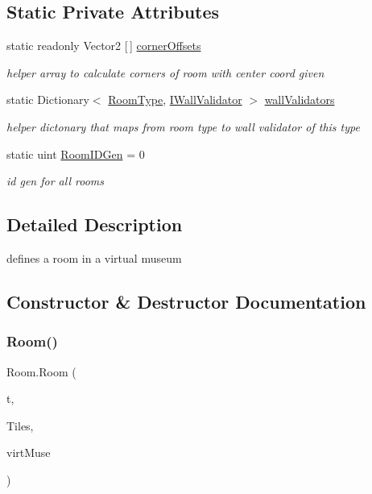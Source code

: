 \subsection*{Static Private Attributes}
\begin{DoxyCompactItemize}
\item 
static readonly Vector2 \mbox{[}$\,$\mbox{]} \mbox{\hyperlink{class_room_aeb66d344acdc21822d0598beb0d7d71b}{corner\+Offsets}}
\begin{DoxyCompactList}\small\item\em helper array to calculate corners of room with center coord given \end{DoxyCompactList}\item 
static Dictionary$<$ \mbox{\hyperlink{_room_8cs_ab540f7414f306325d92272bcef1e34e1}{Room\+Type}}, \mbox{\hyperlink{interface_i_wall_validator}{I\+Wall\+Validator}} $>$ \mbox{\hyperlink{class_room_a274899cf7b41ac5190fb7754817510d6}{wall\+Validators}}
\begin{DoxyCompactList}\small\item\em helper dictonary that maps from room type to wall validator of this type \end{DoxyCompactList}\item 
static uint \mbox{\hyperlink{class_room_a2e52c767e772a29e39cb5598aea534fb}{Room\+I\+D\+Gen}} = 0
\begin{DoxyCompactList}\small\item\em id gen for all rooms \end{DoxyCompactList}\end{DoxyCompactItemize}


\subsection{Detailed Description}
defines a room in a virtual museum 



\subsection{Constructor \& Destructor Documentation}
\mbox{\label{class_room_aae232017aa8caf310d109e90c8821227}} 
\subsubsection{\texorpdfstring{Room()}{Room()}}
{\footnotesize\ttfamily Room.\+Room (\begin{DoxyParamCaption}\item[{\mbox{\hyperlink{_room_8cs_ab540f7414f306325d92272bcef1e34e1}{Room\+Type}}}]{t,  }\item[{List$<$ Vector2\+Int $>$}]{Tiles,  }\item[{\mbox{\hyperlink{class_museum}{Museum}}}]{virt\+Muse }\end{DoxyParamCaption})}

